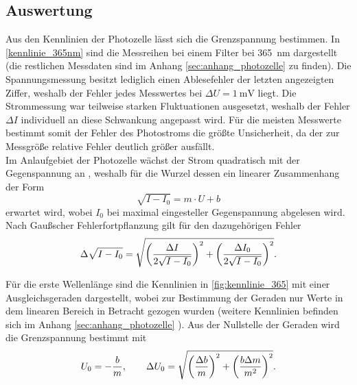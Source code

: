\subsection{Auswertung}



Aus den Kennlinien der Photozelle lässt sich die Grenzspannung bestimmen. In \cref{kennlinie_365nm} sind die
Messreihen bei einem Filter bei \SI{365}{\nano\meter} dargestellt (die restlichen Messdaten sind im Anhang
\ref{sec:anhang_photozelle} zu finden). Die Spannungsmessung besitzt lediglich einen Ablesefehler der letzten
angezeigten Ziffer, weshalb der Fehler jedes Messwertes bei $\Delta U = \SI{1}{\milli\volt}$ liegt.
Die Strommessung war teilweise starken Fluktuationen ausgesetzt, weshalb der Fehler $\Delta I$
individuell an diese Schwankung angepasst wird. Für die meisten Messwerte bestimmt somit der Fehler
des Photostroms die größte Unsicherheit, da der zur Messgröße relative Fehler deutlich größer ausfällt.\\
Im Anlaufgebiet der Photozelle wächst der Strom quadratisch mit der Gegenspannung an
\cite[S.21]{skript},
weshalb für die Wurzel dessen ein linearer Zusammenhang der Form
\begin{equation}
	\sqrt{I - I_0} = m\cdot U + b \nonumber
\end{equation}
erwartet wird, wobei $I_0$ bei maximal eingesteller Gegenspannung abgelesen wird.
Nach Gaußscher Fehlerfortpflanzung\cite{wiki:fehlerfortpflanzung} gilt für den dazugehörigen Fehler
\begin{equation}
	\Delta\sqrt{I - I_0} = \sqrt{\qty(\frac{\Delta I}{2\sqrt{I-I_0}})^2 + \qty(\frac{\Delta I_0}{2\sqrt{I-I_0}})^2} .\nonumber
\end{equation}

Für die erste Wellenlänge sind die Kennlinien in \cref{fig:kennlinie_365} mit einer Ausgleichsgeraden
dargestellt, wobei zur Bestimmung der Geraden nur Werte in dem linearen Bereich in Betracht gezogen wurden
(weitere Kennlinien befinden sich im Anhang \ref{sec:anhang_photozelle}
). Aus der Nullstelle der Geraden wird die Grenzspannung
bestimmt mit
\begin{equation}
	U_0 = - \frac{b}{m},\qquad \Delta U_0 = \sqrt{\qty(\frac{\Delta b}{m})^2 + \qty(\frac{b\Delta m}{m^2})^2} .
	\nonumber
	\label{eq:bestimmung_grenzspannung}
\end{equation}



